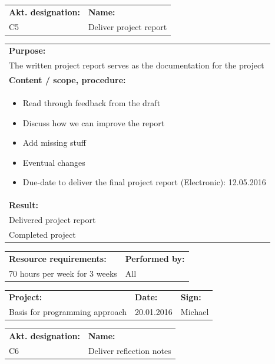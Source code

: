 \documentclass[12pt, a4paper]{article}
\begin{document}
\begin{tabularx}{\textwidth}{|p{40mm}|X|}
	\textbf{Akt. designation:}&\textbf{Name:}\\
	C5&Deliver project report  \\
	\hline
\end{tabularx}

\begin{tabularx}{\textwidth}{|X|}
	\textbf{Purpose:}\\
	 The written project report serves as the documentation for the project\\
	\hline
	\textbf{Content / scope, procedure:}\\
	\begin{itemize}
		\item Read through feedback from the draft 
		\item Discuss how we can improve the report
		\item Add missing stuff
		\item Eventual changes
		\item Due-date to deliver the final project report (Electronic): 12.05.2016

	\end{itemize}\\
 	\hline
	\textbf{Result:}\\
	Delivered project report \\
	Completed project\\
	\hline
\end{tabularx}

\begin{tabularx}{\textwidth}{|X|p{30mm}|}
	\textbf{Resource requirements:}&\textbf{Performed by:}\\
	70 hours per week for 3 weeks&All\\
	\hline
\end{tabularx}

\newpage

\begin{tabularx}{\textwidth}{|X|p{32mm}|p{20mm}|}
	\hline
	\textbf{Project:}&\textbf{Date:}&\textbf{Sign:}\\
	Basis for programming approach&20.01.2016&Michael\\
	\hline
\end{tabularx}

\begin{tabularx}{\textwidth}{|p{40mm}|X|}
	\textbf{Akt. designation:}&\textbf{Name:}\\
	C6&Deliver reflection notes  \\
	\hline
\end{tabularx}
\end{document}

